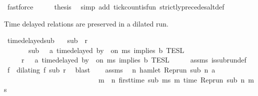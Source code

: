 \begin{isabellebody}
\ fastforce\isanewline
\ \ \isamarkupfalse%
\ \isamarkupfalse%
\ {\isacharquery}thesis\ \isamarkupfalse%
\ {\isacharparenleft}simp\ add{\isacharcolon}\ tick{\isacharunderscore}count{\isacharunderscore}is{\isacharunderscore}fun\ strictly{\isacharunderscore}precedes{\isacharunderscore}alt{\isacharunderscore}def{}{\isacharparenright}\ \isanewline
{}\isamarkupfalse%
%
\endisatagproof
{\isafoldproof}%
%
\isadelimproof
%
\endisadelimproof
%
\begin{isamarkuptext}%
Time delayed relations are preserved in a dilated run.%
\end{isamarkuptext}\isamarkuptrue%
\isamarkupfalse%
\ time{\isacharunderscore}delayed{\isacharunderscore}sub{\isacharcolon}\isanewline
\ \ \ {\isacartoucheopen}sub\ {\isasymlless}\ r{\isacartoucheclose}\isanewline
\ \ \ \ \ \ \ {\isacartoucheopen}sub\ {\isasymin}\ {\isasymlbrakk}\ a\ time{\isacharminus}delayed\ by\ {\isasymdelta}{\isasymtau}\ on\ ms\ implies\ b\ {\isasymrbrakk}\isactrlsub T\isactrlsub E\isactrlsub S\isactrlsub L{\isacartoucheclose}\isanewline
\ \ \ \ \ {\isacartoucheopen}r\ {\isasymin}\ {\isasymlbrakk}\ a\ time{\isacharminus}delayed\ by\ {\isasymdelta}{\isasymtau}\ on\ ms\ implies\ b\ {\isasymrbrakk}\isactrlsub T\isactrlsub E\isactrlsub S\isactrlsub L{\isacartoucheclose}\isanewline
%
\isadelimproof
%
\endisadelimproof
%
\isatagproof
{}\isamarkupfalse%
\ {\isacharminus}\isanewline
\ \ \isamarkupfalse%
\ assms{\isacharparenleft}{}{\isacharparenright}\ is{\isacharunderscore}subrun{\isacharunderscore}def\ \isamarkupfalse%
\ f\ \ {\isacharasterisk}{\isacharcolon}{\isacartoucheopen}dilating\ f\ sub\ r{\isacartoucheclose}\ \isamarkupfalse%
\ blast\isanewline
\ \ \isamarkupfalse%
\ assms{\isacharparenleft}{}{\isacharparenright}\ \isamarkupfalse%
\ {\isacartoucheopen}{\isasymforall}n{\isachardot}\ hamlet\ {\isacharparenleft}{\isacharparenleft}Rep{\isacharunderscore}run\ sub{\isacharparenright}\ n\ a{\isacharparenright}\isanewline
\ \ \ \ \ \ \ \ \ \ \ \ \ \ \ \ \ \ \ \ \ \ \ \ \ \ {\isasymlongrightarrow}\ {\isacharparenleft}{\isasymforall}m\ {\isasymge}\ n{\isachardot}\ first{\isacharunderscore}time\ sub\ ms\ m\ {\isacharparenleft}time\ {\isacharparenleft}{\isacharparenleft}Rep{\isacharunderscore}run\ sub{\isacharparenright}\ n\ ms{\isacharparenright}\ {\isacharplus}\ {\isasymdelta}{\isasymtau}{\isacharparenright}\isanewline

\end{isabellebody}
